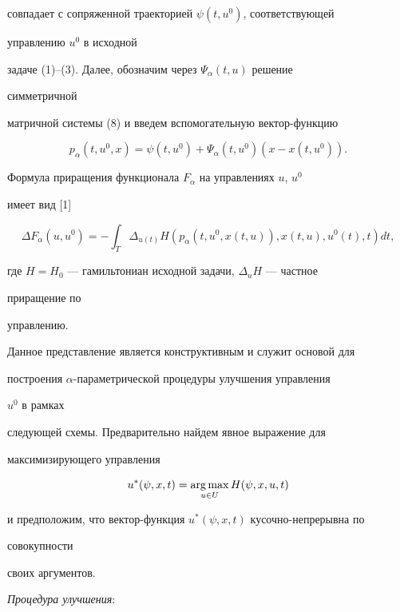 совпадает с сопряженной траекторией $\psi(t,u^0)$, соответствующей 


управлению $u^0$ в исходной 


задаче (1)--(3). Далее, обозначим через $\Psi_\alpha(t,u)$ решение 


симметричной 


матричной системы (8) и введем вспомогательную вектор-функцию 


$$ 


p_\alpha(t,u^0,x)=\psi(t,u^0)+\Psi_\alpha(t,u^0)(x-x(t,u^0)). 


$$ 


Формула приращения функционала $F_\alpha$ на управлениях $u$, $u^0$ 


имеет вид [1] 


\begin{equation} 


\Delta F_\alpha(u,u^0)=-\int_T\Delta_{u(t)}H(p_\alpha 


(t,u^0,x(t,u)),x(t,u),u^0(t),t)dt, 


\end{equation} 


где $H=H_0$ --- гамильтониан исходной задачи, $\Delta_u H$ --- частное 


приращение по 


управлению. 


 


Данное представление является конструктивным и служит основой для 


построения $\alpha$-параметрической процедуры улучшения управления 


$u^0$ в рамках 


следующей схемы. Предварительно найдем явное выражение для 


максимизирующего управления 


$$ 


u^*(\psi,x,t)=\argmax_{u\in U}H(\psi,x,u,t) 


$$ 


и предположим, что вектор-функция $u^*(\psi,x,t)$ кусочно-непрерывна по 


совокупности 


своих аргументов. 


 


{\it Процедура улучшения}: 


